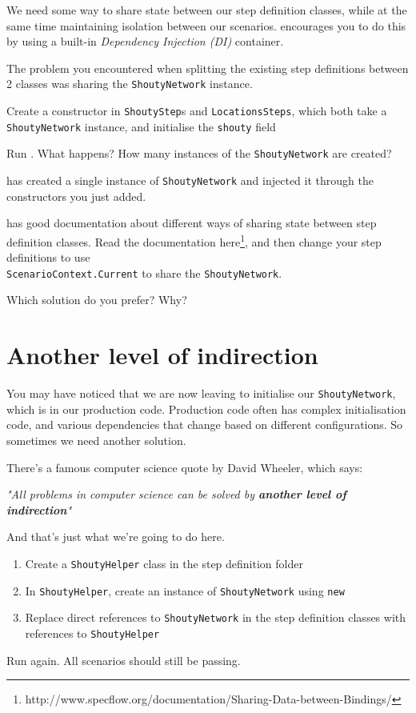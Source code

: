 We need some way to share state between our step definition classes, while at the same time maintaining isolation between our scenarios. \CUKE{} encourages you to do this by using a built-in \emph{Dependency Injection (DI)} container.

The problem you encountered when splitting the existing step definitions between 2 classes was sharing the \texttt{ShoutyNetwork} instance.

Create a constructor in \texttt{ShoutyStep}s and \texttt{LocationsSteps}, which both take a \texttt{ShoutyNetwork} instance, and initialise the \texttt{shouty} field

Run \CUKE{}. What happens? How many instances of the \texttt{ShoutyNetwork} are created?


\CUKE{} has created a single instance of \texttt{ShoutyNetwork} and injected it through the constructors you just added.

\CUKE{} has good documentation about different ways of sharing state between step definition classes. Read  the documentation here\footnote{http://www.specflow.org/documentation/Sharing-Data-between-Bindings/}, and then change your step definitions to use\\ \texttt{ScenarioContext.Current} to share the \texttt{ShoutyNetwork}.

Which solution do you prefer? Why?


\chapter*{Another level of indirection}

You may have noticed that we are now leaving \CUKE{} to initialise our \texttt{ShoutyNetwork}, which is in our production code. Production code often has complex initialisation code, and various dependencies that change based on different configurations. So sometimes we need another solution.

There's a famous computer science quote by David Wheeler, which says:

\setlength{\leftskip}{1cm}

    \textit{"All problems in computer science can be solved by \textbf{another level of indirection}"}

\setlength{\leftskip}{0pt}

And that's just what we're going to do here. 

\begin{enumerate}
    \item Create a \texttt{ShoutyHelper} class in the step definition folder
    \item In \texttt{ShoutyHelper}, create an instance of \texttt{ShoutyNetwork} using \texttt{new}
    \item Replace direct references to \texttt{ShoutyNetwork} in the step definition classes with references to \texttt{ShoutyHelper}
\end{enumerate}

Run \CUKE{} again. All scenarios should still be passing.
